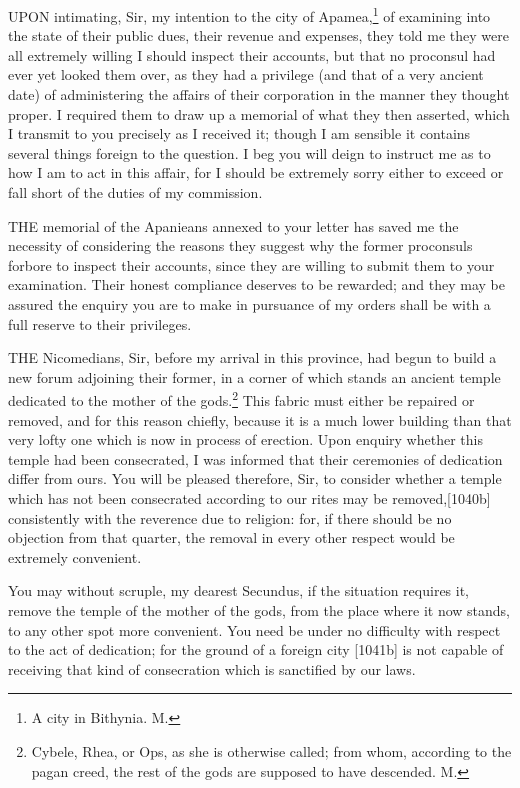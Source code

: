UPON intimating, Sir, my intention to the city of Apamea,\footnote{A city in Bithynia.
M.}
of examining into the state of their public dues, their revenue and
expenses, they told me they were all extremely willing I should inspect
their accounts, but that no proconsul had ever yet looked them over, as
they had a privilege (and that of a very ancient date) of administering
the affairs of their corporation in the manner they thought proper. I
required them to draw up a memorial of what they then asserted, which I
transmit to you precisely as I received it; though I am sensible it
contains several things foreign to the question. I beg you will deign to
instruct me as to how I am to act in this affair, for I should be
extremely sorry either to exceed or fall short of the duties of my
commission.


THE memorial of the Apanieans annexed to your letter has saved me the
necessity of considering the reasons they suggest why the former
proconsuls forbore to inspect their accounts, since they are willing to
submit them to your examination. Their honest compliance deserves to be
rewarded; and they may be assured the enquiry you are to make in pursuance
of my orders shall be with a full reserve to their privileges.


THE Nicomedians, Sir, before my arrival in this province, had begun to
build a new forum adjoining their former, in a corner of which stands an
ancient temple dedicated to the mother of the gods.\footnote{Cybele, Rhea, or Ops,
as she is otherwise called; from whom, according to the pagan creed, the
rest of the gods are supposed to have descended. M.} This fabric must
either be repaired or removed, and for this reason chiefly, because it is
a much lower building than that very lofty one which is now in process of
erection. Upon enquiry whether this temple had been consecrated, I was
informed that their ceremonies of dedication differ from ours. You will be
pleased therefore, Sir, to consider whether a temple which has not been
consecrated according to our rites may be removed,[1040b] consistently
with the reverence due to religion: for, if there should be no objection
from that quarter, the removal in every other respect would be extremely
convenient.


You may without scruple, my dearest Secundus, if the situation requires
it, remove the temple of the mother of the gods, from the place where it
now stands, to any other spot more convenient. You need be under no
difficulty with respect to the act of dedication; for the ground of a
foreign city [1041b] is not capable of receiving that kind
of consecration which is sanctified by our laws.

